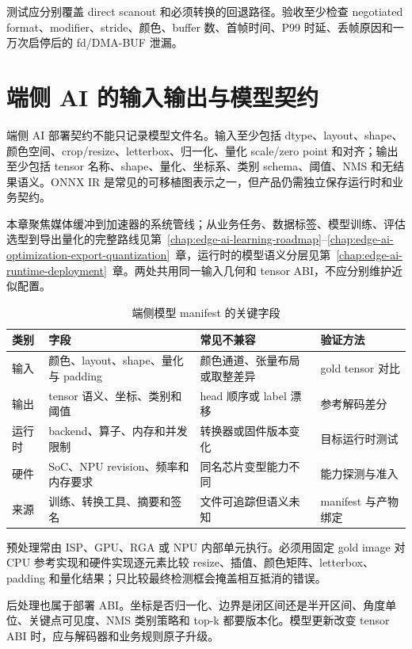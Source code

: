 测试应分别覆盖 direct scanout 和必须转换的回退路径。验收至少检查 negotiated format、modifier、stride、颜色、buffer 数、首帧时间、P99 时延、丢帧原因和一万次启停后的 fd/DMA-BUF 泄漏。

\section{端侧 AI 的输入输出与模型契约}

端侧 AI 部署契约不能只记录模型文件名。输入至少包括 dtype、layout、shape、颜色空间、crop/resize、letterbox、归一化、量化 scale/zero point 和对齐；输出至少包括 tensor 名称、shape、量化、坐标系、类别 schema、阈值、NMS 和无结果语义。ONNX IR 是常见的可移植图表示之一，但产品仍需独立保存运行时和业务契约\cite{onnx-ir}。

本章聚焦媒体缓冲到加速器的系统管线；从业务任务、数据标签、模型训练、评估选型到导出量化的完整路线见第~\ref{chap:edge-ai-learning-roadmap}--\ref{chap:edge-ai-optimization-export-quantization}~章，运行时的模型语义分层见第~\ref{chap:edge-ai-runtime-deployment}~章。两处共用同一输入几何和 tensor ABI，不应分别维护近似配置。

\begin{table}[H]
  \centering
  \caption{端侧模型 manifest 的关键字段}
  \begin{tabular}{p{30mm}p{46mm}p{38mm}p{23mm}}
    \hline
    类别 & 字段 & 常见不兼容 & 验证方法 \\
    \hline
    输入 & 颜色、layout、shape、量化与 padding & 颜色通道、张量布局或取整差异 & gold tensor 对比 \\
    输出 & tensor 语义、坐标、类别和阈值 & head 顺序或 label 漂移 & 参考解码差分 \\
    运行时 & backend、算子、内存和并发限制 & 转换器或固件版本变化 & 目标运行时测试 \\
    硬件 & SoC、NPU revision、频率和内存要求 & 同名芯片变型能力不同 & 能力探测与准入 \\
    来源 & 训练、转换工具、摘要和签名 & 文件可追踪但语义未知 & manifest 与产物绑定 \\
    \hline
  \end{tabular}
\end{table}

预处理常由 ISP、GPU、RGA 或 NPU 内部单元执行。必须用固定 gold image 对 CPU 参考实现和硬件实现逐元素比较 resize、插值、颜色矩阵、letterbox、padding 和量化结果；只比较最终检测框会掩盖相互抵消的错误。

后处理也属于部署 ABI。坐标是否归一化、边界是闭区间还是半开区间、角度单位、关键点可见度、NMS 类别策略和 top-k 都要版本化。模型更新改变 tensor ABI 时，应与解码器和业务规则原子升级。

